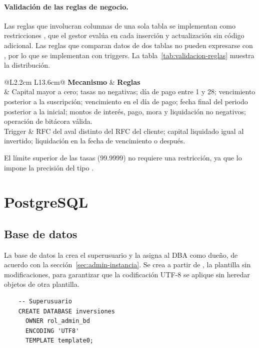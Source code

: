 \paragraph{Validación de las reglas de negocio.} Las reglas que involucran columnas de una sola tabla se implementan como restricciones , que el gestor evalúa en cada inserción y actualización sin código adicional. Las reglas que comparan datos de dos tablas no pueden expresarse con , por lo que se implementan con triggers. La tabla~\ref{tab:validacion-reglas} muestra la distribución.

\begin{table}[H]
	\centering
	\small
	\caption{Mecanismo de validación de cada regla de negocio}
	\label{tab:validacion-reglas}
	\begin{tabular}{@{}L{2.2cm} L{13.6cm}@{}}
		\toprule
		\textbf{Mecanismo} & \textbf{Reglas} \\
		\midrule
		 & Capital mayor a cero; tasas no negativas; día de pago entre 1 y 28; vencimiento posterior a la suscripción; vencimiento en el día de pago; fecha final del periodo posterior a la inicial; montos de interés, pago, mora y liquidación no negativos; operación de bitácora válida. \\
		Trigger & RFC del aval distinto del RFC del cliente; capital liquidado igual al invertido; liquidación en la fecha de vencimiento o después. \\
		\bottomrule
	\end{tabular}
\end{table}

El límite superior de las tasas (99.9999) no requiere una restricción, ya que lo impone la precisión del tipo .

\section{PostgreSQL}

\subsection{Base de datos}

La base de datos la crea el superusuario y la asigna al DBA como dueño, de acuerdo con la sección~\ref{sec:admin-instancia}. Se crea a partir de , la plantilla sin modificaciones, para garantizar que la codificación UTF-8 se aplique sin heredar objetos de otra plantilla.

\begin{verbatim}
	-- Superusuario
	CREATE DATABASE inversiones
	  OWNER rol_admin_bd
	  ENCODING 'UTF8'
	  TEMPLATE template0;
\end{verbatim}

